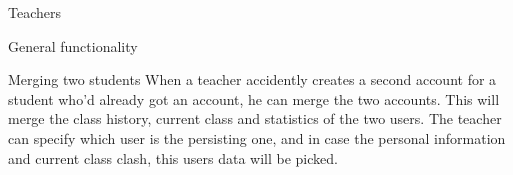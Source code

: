 \begin{section}{Teachers}
\begin{subsection}{General functionality}
        \begin{subsubsection}{Merging two students}
            When a teacher accidently creates a second account for a student
            who'd already got an account, he can merge the two accounts. This
            will merge the class history, current class and statistics of the
            two users. The teacher can specify which user is the persisting one,
            and in case the personal information and current class clash, this
            users data will be picked.
        \end{subsubsection}
    \end{subsection}

\end{section}
